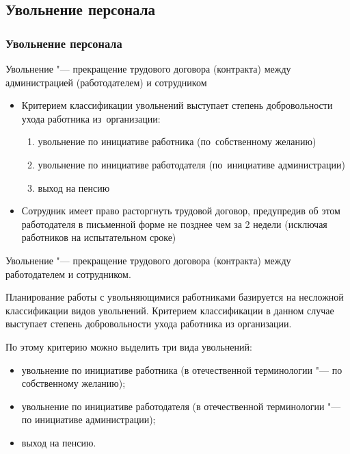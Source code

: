 \documentclass{../industrial-development}
\begin{document}
\subsection{Увольнение персонала}
\begin{frame} \frametitle{Увольнение персонала}

\alert{Увольнение} "--- прекращение трудового договора (контракта) между администрацией (работодателем) и сотрудником 

  \begin{itemize}
\item Критерием классификации увольнений выступает степень добровольности ухода работника из~организации:
  \begin{enumerate}
\item увольнение по инициативе работника (по~собственному желанию)
\item увольнение по инициативе работодателя (по~инициативе администрации)
\item выход на пенсию
	  \end{enumerate}
		\item Сотрудник имеет право расторгнуть трудовой договор, предупредив об этом работодателя в письменной форме не позднее чем за 2 недели (исключая работников на испытательном сроке)

	  \end{itemize}

\end{frame}

\lecturenotes

Увольнение "--- прекращение трудового договора (контракта) между работодателем и сотрудником.

Планирование работы с увольняющимися работниками базируется на несложной классификации видов увольнений. Критерием классификации в данном случае выступает степень добровольности ухода работника из организации.

По этому критерию можно выделить три вида увольнений:
 \begin{itemize}
\item увольнение по инициативе работника (в отечественной терминологии "--- по собственному желанию);
\item увольнение по инициативе работодателя (в отечественной терминологии "--- по инициативе администрации);
\item выход на пенсию.
 \end{itemize}
\end{document}
